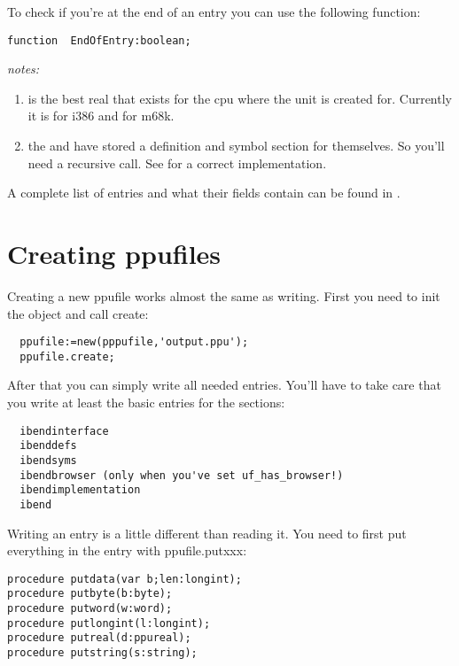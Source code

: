 \documentclass{report}
\begin{document}
To check if you're at the end of an entry you can use the following
function:

\begin{verbatim}
function  EndOfEntry:boolean;                                               
\end{verbatim}
{\em notes:}
\begin{enumerate}
\item {} is the best real that exists for the cpu where the
unit is created for. Currently it is  for i386 and 
 for m68k.
\item the  and  have stored a definition 
and symbol section for themselves. So you'll need a recursive call. See
 for a correct implementation.
\end{enumerate}

A complete list of entries and what their fields contain can be found
in .

\section{Creating ppufiles}

Creating a new ppufile works almost the same as writing. First you need
to init the object and call create:
\begin{verbatim}
  ppufile:=new(pppufile,'output.ppu');
  ppufile.create;
\end{verbatim}

After that you can simply write all needed entries. You'll have to take
care that you write at least the basic entries for the sections:
\begin{verbatim}
  ibendinterface
  ibenddefs
  ibendsyms
  ibendbrowser (only when you've set uf_has_browser!)
  ibendimplementation
  ibend
\end{verbatim}

Writing an entry is a little different than reading it. You need to first
put everything in the entry with ppufile.putxxx:
\begin{verbatim}
procedure putdata(var b;len:longint);                                       
procedure putbyte(b:byte);                                                  
procedure putword(w:word);                                                  
procedure putlongint(l:longint);                                            
procedure putreal(d:ppureal);                                               
procedure putstring(s:string); 
\end{verbatim}
\end{document}
